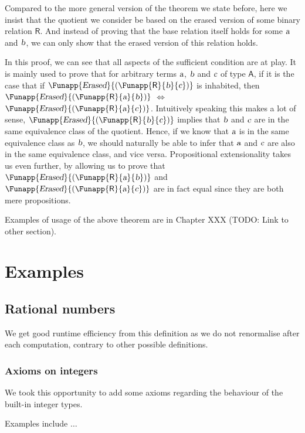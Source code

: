 \documentclass[11pt]{article}
\newcommand\kw[1] {\textsf{#1}}
\newcommand\id[1] {\textsl{#1}}
\begin{document}
Compared to the more general version of the theorem we state before, here we insist that the quotient we consider be based on the erased version of some binary relation $\kw{R}$. And instead of proving that the base relation itself holds for some $\id{a}$ and $\id{b}$, we can only show that the erased version of this relation holds.

In this proof, we can see that all aspects of the sufficient condition are at play. It is mainly used to prove that for arbitrary terms $\id{a}$, $\id{b}$ and $\id{c}$ of type $\kw{A}$, if it is the case that if $\Funapp{\id{Erased}}{(\Funapp{\kw{R}}{\id{b}}{\id{c}})}$ is inhabited, then $\Funapp{\id{Erased}}{(\Funapp{\kw{R}}{\id{a}}{\id{b}})}$ $\iff$ $\Funapp{\id{Erased}}{(\Funapp{\kw{R}}{\id{a}}{\id{c}})}$. Intuitively speaking this makes a lot of sense, $\Funapp{\id{Erased}}{(\Funapp{\kw{R}}{\id{b}}{\id{c}})}$ implies that $\id{b}$ and $\id{c}$ are in the same equivalence class of the quotient. Hence, if we know that $\id{a}$ is in the same equivalence class as $\id{b}$, we should naturally be able to infer that $\id{a}$ and $\id{c}$ are also in the same equivalence class, and vice versa. Propositional extensionality takes us even further, by allowing us to prove that $\Funapp{\id{Erased}}{(\Funapp{\kw{R}}{\id{a}}{\id{b}})}$ and $\Funapp{\id{Erased}}{(\Funapp{\kw{R}}{\id{a}}{\id{c}})}$ are in fact equal since they are both mere propositions.

Examples of usage of the above theorem are in Chapter XXX (TODO: Link to other section).

\section{Examples}
\subsection{Rational numbers}
We get good runtime efficiency from this definition as we do not renormalise after each computation, contrary to other possible definitions.

\subsubsection{Axioms on integers}

We took this opportunity to add some axioms regarding the behaviour of the built-in integer types. 

Examples include $\ldots$
\end{document}

